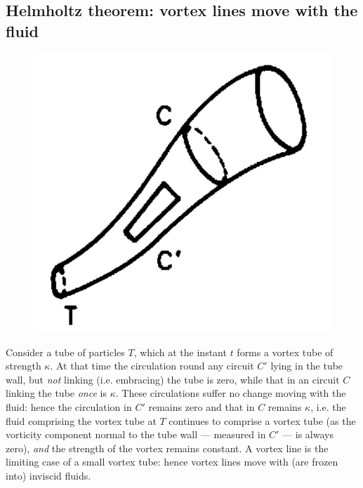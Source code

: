 \documentclass[twoside,a4paper,11pt]{report}
\begin{document}


\subsection{Helmholtz theorem: vortex lines move with the fluid}

\begin{figure}
\centerline{\includegraphics[width=2.in]{Section45.pdf}}
\label{fig5}
\end{figure}

Consider a tube of particles $T$, which at the instant $t$ forms a vortex tube 
of strength $\kappa $. At that time the circulation round any circuit $C'$ 
lying in the tube wall, but \textit{not} linking (i.e. embracing) the tube is zero, 
while that in an circuit $C$ linking the tube \textit{once} is $\kappa $. These 
circulations suffer no change moving with the fluid: hence the circulation 
in $C'$ remains zero and that in $C$ remains $\kappa $, i.e. the fluid 
comprising the vortex tube at $T$ continues to comprise a vortex tube (as the 
vorticity component normal to the tube wall --- measured in $C'$ --- is always 
zero), \textit{and} the strength of the vortex remains constant. A vortex line is the 
limiting case of a small vortex tube: hence vortex lines move with (are 
frozen into) inviscid fluids.
\end{document}
